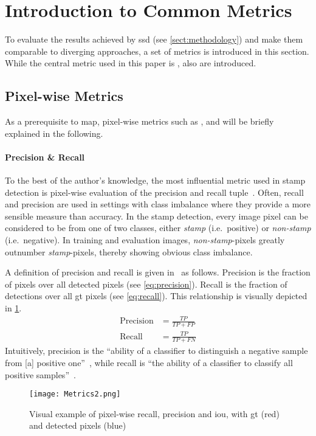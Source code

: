\section{Introduction to Common Metrics}\label{sect:metrics}
To evaluate the results achieved by \gls{ssd} (see \cref{sect:methodology}) and
make them comparable to diverging approaches, a set of metrics is introduced in
this section. While the central metric used in this paper is ,
also  are introduced.

\subsection{Pixel-wise Metrics}\label{subsect:pixel-wise-metrics}
As a prerequisite to \gls{map}, pixel-wise metrics such as ,
 and  will be briefly explained in the
following.

\paragraph{Precision \& Recall}\label{par:precision-recall}
To the best of the author's knowledge, the most influential metric used in stamp 
detection is pixel-wise evaluation of the precision and recall
tuple~\cite{Nandedkar.2015b,Younas.2017,Ahmed.2013,Dey.2015,Micenkova.2011, Bhalgat.2016, Micenkova.2015,Nandedkar.2015b}.
Often, recall and precision are used in settings with class imbalance where they
provide a more sensible measure than accuracy. In the stamp detection, every
image pixel can be considered to be from one of two classes, either
\textit{stamp} (i.e.\ positive) or \textit{non-stamp} (i.e.\ negative). In
training and evaluation images, \textit{non-stamp}-pixels greatly outnumber
\textit{stamp}-pixels, thereby showing obvious class imbalance.

A definition of precision and recall is given in~\cite[423]{Goodfellow.2016} as
follows. Precision is the fraction of 
pixels over all detected pixels (see \cref{eq:precision}). Recall is the fraction
of  detections over all \gls{gt} pixels
(see \cref{eq:recall}). This relationship is visually depicted in \cref{fig:visual-precision-recall}.
\begin{align}
    \label{eq:precision}\text{Precision}    &= \frac{TP}{TP + FP}\\
    \label{eq:recall}\text{Recall}          &= \frac{TP}{TP + FN}
\end{align}
Intuitively, precision is the ``ability of a classifier to distinguish a
negative sample from [a] positive one''~\cite{Younas.2017}, while
recall is ``the ability of a classifier to classify all positive samples''~\cite{Younas.2017}.
\begin{figure}
    \centering
    \texttt{[image: Metrics2.png]}
    \caption[Visual example of pixel-wise recall, precision and \gls{iou}]
    {Visual example of pixel-wise recall, precision and \gls{iou}, with
    \gls{gt} (red) and detected pixels (blue)}\label{fig:visual-precision-recall}
\end{figure}

